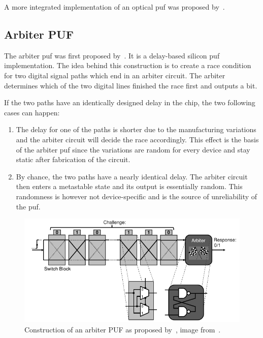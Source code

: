 A more integrated implementation of an optical \gls{puf} was proposed by~\cite{Rhrmair2013}.

\subsection{Arbiter PUF}

The arbiter \gls{puf} was first proposed by~\cite{Lee2004}. It is a delay-based silicon \gls{puf} implementation. The idea behind this construction is to create a race condition for two digital signal paths which end in an arbiter circuit. The arbiter determines which of the two digital lines finished the race first and outputs a bit.

If the two paths have an identically designed delay in the chip, the two following cases can happen\cite{Maes2013}:

\begin{enumerate}
    \item The delay for one of the paths is shorter due to the manufacturing variations and the arbiter circuit will decide the race accordingly. This effect is the basis of the arbiter \gls{puf} since the variations are random for every device and stay static after fabrication of the circuit.
    \item By chance, the two paths have a nearly identical delay. The arbiter circuit then enters a metastable state and its output is essentially random. This randomness is however not device-specific and is the source of unreliability of the \gls{puf}.
\end{enumerate}

\begin{figure}[h!]
    \centering
    \captionsetup{justification=centering,margin=0.5cm}
    \includegraphics[width=\textwidth]{images/arbiter_puf.pdf}
    \caption[Construction of an arbiter PUF.]{Construction of an arbiter PUF as proposed by~\cite{Lee2004}, image from~\cite{Maes2012}.}
    \label{fig:arbiter_puf}
\end{figure}

